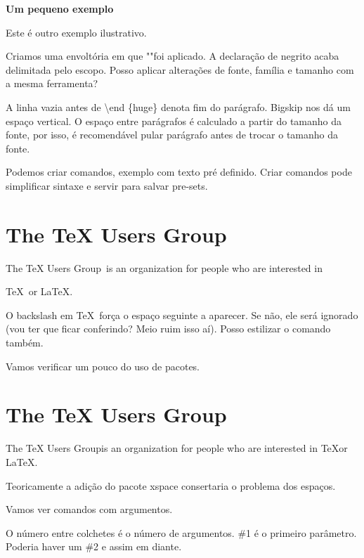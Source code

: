 \documentclass[a4paper, 12pt]{article}
\begin{document}
\begin{huge}
    \bfseries
    Um pequeno exemplo

\end{huge}

\bigskip

Este é outro exemplo ilustrativo.


Criamos uma envoltória em que \huge "\normalsize "foi aplicado.
A declaração de negrito acaba delimitada pelo escopo.
Posso aplicar alterações de fonte, família e tamanho com a mesma ferramenta?

A linha vazia antes de \textbackslash end \{huge\} denota fim do parágrafo.
Bigskip nos dá um espaço vertical.
O espaço entre parágrafos é calculado a partir do tamanho 
da fonte, por isso, é recomendável pular parágrafo antes
de trocar o tamanho da fonte.

Podemos criar comandos, exemplo com texto pré definido.
Criar comandos pode simplificar sintaxe e servir para salvar
pre-sets.

\newcommand{\TUG}{TeX Users Group}

\section{The \TUG}

The \TUG\ is an organization for people who are interested in 

\TeX\ or \LaTeX.

\newcommand{\TUG}{\textsc{TeX Users Group}}

O backslash em \TeX\ força o espaço seguinte a aparecer.
Se não, ele será ignorado
(vou ter que ficar conferindo? Meio ruim isso aí).
Posso estilizar o comando também.


Vamos verificar um pouco do uso de pacotes.

\section{The \TUG}

The \TUG is an organization for people
who are interested in \TeX or \LaTeX.

Teoricamente a adição do pacote xspace consertaria o problema dos espaços.

Vamos ver comandos com argumentos.

\newcommand{\keyword}[1]{\textbf{#1}}

O número entre colchetes é o número de argumentos.
\#1 é o primeiro parâmetro. Poderia haver um \#2 e assim
em diante.
\end{document}
